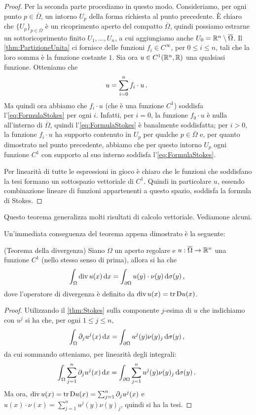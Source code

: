 \begin{proof}
	Per la seconda parte procediamo in questo modo.
	Consideriamo, per ogni punto $p\in \overline\Omega$, un intorno $U_p$ della forma richiesta al punto precedente. È chiaro che $\{U_p\}_{p\in\overline\Omega}$ è un
	ricoprimento aperto del compatto $\overline\Omega$, quindi possiamo estrarne un sottoricoprimento finito $U_1,\dots,U_n$, a cui aggiungiamo anche
	$U_0=\mathbb R^n \setminus \overline\Omega$. Il \cref{thm:PartizioneUnita} ci fornisce delle funzioni $f_i\in C^{\infty}$, per $0\le i \le n$,
	tali che la loro somma è la funzione costante $1$.
	Sia ora $u\in C^1(\mathbb R^n,\mathbb R)$ una qualsiasi funzione. Otteniamo che
	\[
		u = \sum_{i=0}^n f_i\cdot u\, \text{. }
	\]
	Ma quindi ora abbiamo che $f_i \cdot u$ (che è una funzione $C^1$) soddisfa l'\cref{eq:FormulaStokes} per ogni $i$.
	Infatti, per $i=0$, la funzione $f_0\cdot u$ è nulla all'interno di $\overline\Omega$, quindi l'\cref{eq:FormulaStokes} è banalmente soddisfatta; per $i>0$, la funzione $f_i \cdot u$ ha supporto contenuto in $U_p$ per qualche $p\in \overline\Omega$ e, per quanto
	dimostrato nel punto precedente, abbiamo che per questo intorno $U_p$ ogni funzione $C^1$ con supporto al suo interno soddisfa l'\cref{eq:FormulaStokes}.
	
	Per linearità di tutte le espressioni in gioco è chiaro che le funzioni che soddisfano la tesi formano
	un sottospazio vettoriale di $C^1$. Quindi in particolare $u$, essendo combinazione lineare di funzioni appartenenti a questo spazio, soddisfa la formula di Stokes.
\end{proof}

Questo teorema generalizza molti risultati di calcolo vettoriale. Vediamone alcuni.

Un'immediata conseguenza del teorema appena dimostrato è la seguente:

\begin{corollary}(Teorema della divergenza)
	\label{cor:thDivergenza}
	Siano $\Omega$ un aperto regolare e $u:\overline\Omega \rightarrow \mathbb R^n$ una funzione $C^1$ (nello stesso senso di prima), allora si ha che
	\begin{equation}\label{eq:thDivergenza}
		\int_{\Omega} \operatorname{div} u (x) \,\mathrm d x = \int_{\partial \Omega} u(y)\cdot\nu(y) \,\mathrm d \sigma(y)\, \text{, }
	\end{equation}
	dove l'operatore di divergenza è definito da $\operatorname{div} u(x)=\operatorname{tr}\mathrm D u(x)$.
\end{corollary}

\begin{proof}
	Utilizzando il \cref{thm:Stokes} sulla componente $j$-esima di $u$ che indichiamo con $u^j$ si ha che, per ogni $1\le j\le n$,
	\[
		\int_{\Omega} \partial_j u^j(x) \,\mathrm d x = \int_{\partial \Omega} u^j(y)\nu(y)_j \,\mathrm d \sigma(y)\, \text{, }
	\]
	da cui sommando otteniamo, per linearità degli integrali:
	\[
		\int_{\Omega} \sum_{j=1}^n\partial_j u^j(x) \,\mathrm d x = \int_{\partial \Omega} \sum_{j=1}^n u^j(y)\nu(y)_j \,\mathrm d \sigma(y)\, \text{. }
	\]
	Ma ora, $\operatorname{div} u (x)= \operatorname{tr}\mathrm D u(x) = \sum_{j=1}^n \partial_j u^j(x)$ e $u(x)\cdot\nu(x)=\sum_{j=1}^n u^j(y)\nu(y)_j$,
	quindi si ha la tesi.
\end{proof}

